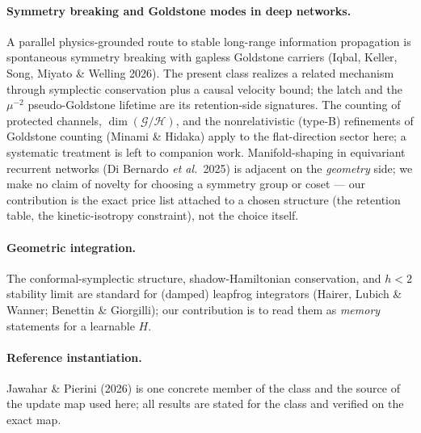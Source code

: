 \documentclass[11pt]{article}
\theoremstyle{plain}
\theoremstyle{definition}
\begin{document}
\paragraph{Symmetry breaking and Goldstone modes in deep networks.} A parallel physics-grounded route to stable long-range information propagation is spontaneous symmetry breaking with gapless Goldstone carriers (Iqbal, Keller, Song, Miyato \& Welling 2026). The present class realizes a related mechanism through symplectic conservation plus a causal velocity bound; the latch and the $\mu^{-2}$ pseudo-Goldstone lifetime are its retention-side signatures. The counting of protected channels, $\dim(\mathcal G/\mathcal H)$, and the nonrelativistic (type-B) refinements of Goldstone counting (Minami \& Hidaka) apply to the flat-direction sector here; a systematic treatment is left to companion work. Manifold-shaping in equivariant recurrent networks (Di Bernardo \emph{et al.}\ 2025) is adjacent on the \emph{geometry} side; we make no claim of novelty for choosing a symmetry group or coset --- our contribution is the exact price list attached to a chosen structure (the retention table, the kinetic-isotropy constraint), not the choice itself.

\paragraph{Geometric integration.} The conformal-symplectic structure, shadow-Hamiltonian conservation, and $h<2$ stability limit are standard for (damped) leapfrog integrators (Hairer, Lubich \& Wanner; Benettin \& Giorgilli); our contribution is to read them as \emph{memory} statements for a learnable $H$.

\paragraph{Reference instantiation.} Jawahar \& Pierini (2026) is one concrete member of the class and the source of the update map used here; all results are stated for the class and verified on the exact map.
\end{document}

